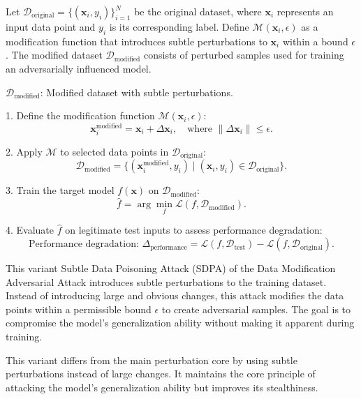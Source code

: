 Let $\mathcal{D}_{\text{original}} = \{(\mathbf{x}_i, y_i)\}_{i=1}^{N}$ be the original dataset, where $\mathbf{x}_i$ represents an input data point and $y_i$ is its corresponding label. Define $\mathcal{M}(\mathbf{x}_i, \epsilon)$ as a modification function that introduces subtle perturbations to $\mathbf{x}_i$ within a bound $\epsilon$. The modified dataset $\mathcal{D}_{\text{modified}}$ consists of perturbed samples used for training an adversarially influenced model.


$\mathcal{D}_{\text{modified}}$: Modified dataset with subtle perturbations.

1. Define the modification function $\mathcal{M}(\mathbf{x}_i, \epsilon)$:
   \[
   \mathbf{x}_i^{\text{modified}} = \mathbf{x}_i + \Delta \mathbf{x}_i, \quad \text{where } \|\Delta \mathbf{x}_i\| \leq \epsilon.
   \]

2. Apply $\mathcal{M}$ to selected data points in $\mathcal{D}_{\text{original}}$:
   \[
   \mathcal{D}_{\text{modified}} = \{(\mathbf{x}_i^{\text{modified}}, y_i) \mid (\mathbf{x}_i, y_i) \in \mathcal{D}_{\text{original}}\}.
   \]

3. Train the target model $f(\mathbf{x})$ on $\mathcal{D}_{\text{modified}}$:
   \[
   \hat{f} = \arg \min_f \mathcal{L}(f, \mathcal{D}_{\text{modified}}).
   \]

4. Evaluate $\hat{f}$ on legitimate test inputs to assess performance degradation:
   \[
   \text{Performance degradation: } \Delta_{\text{performance}} = \mathcal{L}(f, \mathcal{D}_{\text{test}}) - \mathcal{L}(f, \mathcal{D}_{\text{original}}).
   \]

This variant Subtle Data Poisoning Attack (SDPA) of the Data Modification Adversarial Attack introduces subtle perturbations to the training dataset. Instead of introducing large and obvious changes, this attack modifies the data points within a permissible bound $\epsilon$ to create adversarial samples. The goal is to compromise the model's generalization ability without making it apparent during training.

This variant differs from the main perturbation core by using subtle perturbations instead of large changes. It maintains the core principle of attacking the model's generalization ability but improves its stealthiness.